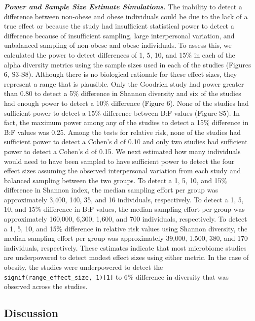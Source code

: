 \documentclass[12pt,]{article}
\begin{document}
\textbf{\emph{Power and Sample Size Estimate Simulations.}} The
inability to detect a difference between non-obese and obese individuals
could be due to the lack of a true effect or because the study had
insufficient statistical power to detect a difference because of
insufficient sampling, large interpersonal variation, and unbalanced
sampling of non-obese and obese individuals. To assess this, we
calculated the power to detect differences of 1, 5, 10, and 15\% in each
of the alpha diversity metrics using the sample sizes used in each of
the studies (Figures 6, S3-S8). Although there is no biological
rationale for these effect sizes, they represent a range that is
plausible. Only the Goodrich study had power greater than 0.80 to detect
a 5\% difference in Shannon diversity and six of the studies had enough
power to detect a 10\% difference (Figure 6). None of the studies had
sufficient power to detect a 15\% difference between B:F values (Figure
S5). In fact, the maximum power among any of the studies to detect a
15\% difference in B:F values was 0.25. Among the tests for relative
risk, none of the studies had sufficient power to detect a Cohen's d of
0.10 and only two studies had sufficient power to detect a Cohen's d of
0.15. We next estimated how many individuals would need to have been
sampled to have sufficient power to detect the four effect sizes
assuming the observed interpersonal variation from each study and
balanced sampling between the two groups. To detect a 1, 5, 10, and 15\%
difference in Shannon index, the median sampling effort per group was
approximately 3,400, 140, 35, and 16 individuals, respectively. To
detect a 1, 5, 10, and 15\% difference in B:F values, the median
sampling effort per group was approximately 160,000, 6,300, 1,600, and
700 individuals, respectively. To detect a 1, 5, 10, and 15\% difference
in relative risk values using Shannon diversity, the median sampling
effort per group was approximately 39,000, 1,500, 380, and 170
individuals, respectively. These estimates indicate that most microbiome
studies are underpowered to detect modest effect sizes using either
metric. In the case of obesity, the studies were underpowered to detect
the \texttt{signif(range\_effect\_size,\ 1){[}1{]}} to 6\% difference in
diversity that was observed across the studies.

\subsection{Discussion}\label{discussion}
\end{document}
